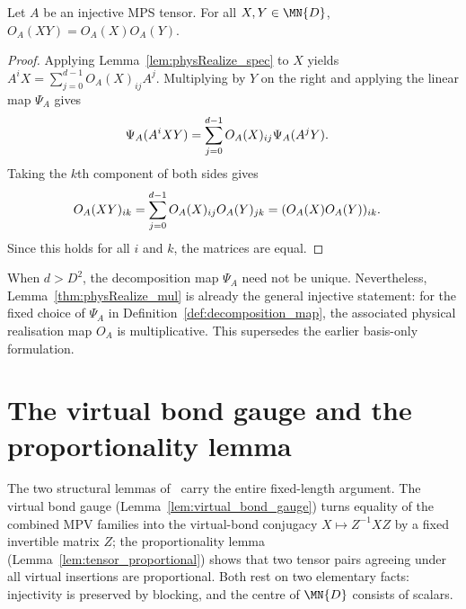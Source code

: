 \begin{lemma}%
    \label{thm:physRealize_mul}
    \leanok
    Let $A$ be an injective MPS tensor.
    For all $X,Y\in\MN{D}$,
    $O_A(XY)=O_A(X)O_A(Y)$.
\end{lemma}

\begin{proof}
    \leanok
    Applying Lemma~\ref{lem:physRealize_spec} to $X$ yields
    $A^iX=\sum_{j=0}^{d-1}O_A(X)_{ij}A^j$.
    Multiplying by $Y$ on the right and applying the linear map $\Psi_A$
    gives
    \begin{align}
        \Psi_A(A^iXY)
         & =\sum_{j=0}^{d-1}O_A(X)_{ij}\Psi_A(A^jY).
        \notag
    \end{align}
    Taking the $k$th component of both sides gives
    \begin{align}
        O_A(XY)_{ik}
         & =\sum_{j=0}^{d-1}O_A(X)_{ij}O_A(Y)_{jk}
        =(O_A(X)O_A(Y))_{ik}.
        \notag
    \end{align}
    Since this holds for all $i$ and $k$, the matrices are equal.
\end{proof}

\begin{remark}
    \label{rem:physRealize_mul_general}
    When $d>D^2$, the decomposition map $\Psi_A$ need not be unique.
    Nevertheless, Lemma~\ref{thm:physRealize_mul} is already the
    general injective statement: for the fixed choice of $\Psi_A$ in
    Definition~\ref{def:decomposition_map}, the associated physical
    realisation map $O_A$ is multiplicative.
    This supersedes the earlier basis-only formulation.
\end{remark}

\section{The virtual bond gauge and the proportionality lemma}%
\label{sec:virtual_bond_gauge}

The two structural lemmas of~\cite{Molnar2018NormalPEPS} carry the entire
fixed-length argument. The virtual bond gauge
(Lemma~\ref{lem:virtual_bond_gauge}) turns equality of the combined MPV
families into the virtual-bond conjugacy $X\mapsto Z^{-1}XZ$ by a fixed
invertible matrix $Z$; the proportionality
lemma (Lemma~\ref{lem:tensor_proportional}) shows that two tensor pairs
agreeing under all virtual insertions are proportional. Both rest on two
elementary facts: injectivity is preserved by blocking, and the centre of
$\MN{D}$ consists of scalars.

